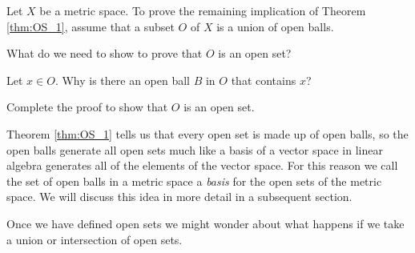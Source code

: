 \begin{activity} Let $X$ be a metric space. To prove the remaining implication of Theorem \ref{thm:OS_1}, assume that a subset $O$ of $X$ is a union of open balls. 
\ba
\item What do we need to show to prove that $O$ is an open set?

\item Let $x \in O$. Why is there an open ball $B$ in $O$ that contains $x$?

\item Complete the proof to show that $O$ is an open set.

\ea

\end{activity}

\begin{comment}

\ActivitySolution
\ba
\item We need to show that $O$ is a neighborhood of each of its points. 

\item Let $x \in O$. Since $O$ is a union of open balls, there must be an open ball $B$ in $O$ that contains $x$.  

\item Since every ball is a neighborhood of each of its points, there exists $\epsilon > 0$ such that $B(x, \epsilon) \subseteq B \subseteq O$. Thus, $O$ is a neighborhood of each of its points and is therefore an open set.

\ea

\end{comment}

Theorem \ref{thm:OS_1} tells us that every open set is made up of open balls, so the open balls generate all open sets much like a basis of a vector space in linear algebra generates all of the elements of the vector space. For this reason we call the set of open balls in a metric space a \emph{basis} for the open sets of the metric space. We will discuss this idea in more detail in a subsequent section.


Once we have defined open sets we might wonder about what happens if we take a union or intersection of open sets. 

